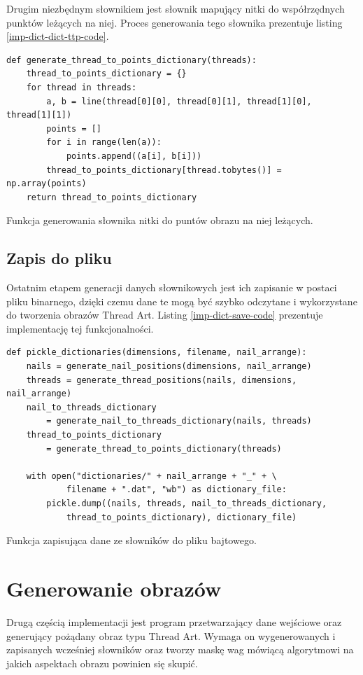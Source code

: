         Drugim niezbędnym słownikiem jest słownik mapujący nitki do współrzędnych punktów leżących na niej. Proces generowania tego słownika prezentuje listing \ref{imp-dict-dict-ttp-code}.
        \begin{code}[H]
        \begin{verbatim}
def generate_thread_to_points_dictionary(threads):
    thread_to_points_dictionary = {}
    for thread in threads:
        a, b = line(thread[0][0], thread[0][1], thread[1][0], thread[1][1])
        points = []
        for i in range(len(a)):
            points.append((a[i], b[i]))
        thread_to_points_dictionary[thread.tobytes()] = np.array(points)
    return thread_to_points_dictionary
        \end{verbatim}
        \caption{Funkcja generowania słownika nitki do puntów obrazu na niej leżących.}
        \label{imp-dict-dict-ttp-code}
        \end{code}
        
        \subsection{Zapis do pliku} \label{imp-dict-save}
        Ostatnim etapem generacji danych słownikowych jest ich zapisanie w postaci pliku binarnego, dzięki czemu dane te mogą być szybko odczytane i wykorzystane do tworzenia obrazów Thread Art. Listing \ref{imp-dict-save-code} prezentuje implementację tej funkcjonalności.
        \begin{code}[H]
        \begin{verbatim}
def pickle_dictionaries(dimensions, filename, nail_arrange):
    nails = generate_nail_positions(dimensions, nail_arrange)
    threads = generate_thread_positions(nails, dimensions, nail_arrange)
    nail_to_threads_dictionary 
        = generate_nail_to_threads_dictionary(nails, threads)
    thread_to_points_dictionary 
        = generate_thread_to_points_dictionary(threads)

    with open("dictionaries/" + nail_arrange + "_" + \
            filename + ".dat", "wb") as dictionary_file:
        pickle.dump((nails, threads, nail_to_threads_dictionary, 
            thread_to_points_dictionary), dictionary_file)
        \end{verbatim}
        \caption{Funkcja zapisująca dane ze słowników do pliku bajtowego.}
        \label{imp-dict-save-code}
        \end{code}
        
    \section{Generowanie obrazów} \label{imp-art}
    Drugą częścią implementacji jest program przetwarzający dane wejściowe oraz generujący pożądany obraz typu Thread Art. Wymaga on wygenerowanych i zapisanych wcześniej słowników oraz tworzy maskę wag mówiącą algorytmowi na jakich aspektach obrazu powinien się skupić.
